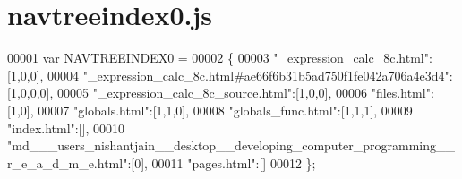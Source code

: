\hypertarget{navtreeindex0_8js_source}{\section{navtreeindex0.\+js}
\label{navtreeindex0_8js_source}
}

\begin{DoxyCode}
\hypertarget{navtreeindex0_8js_source_l00001}{}\hyperlink{navtreeindex0_8js_a27601402e464d8aaacc40c422ad0426a}{00001} var \hyperlink{navtreeindex0_8js_a27601402e464d8aaacc40c422ad0426a}{NAVTREEINDEX0} =
00002 \{
00003 \textcolor{stringliteral}{"\_expression\_calc\_8c.html"}:[1,0,0],
00004 \textcolor{stringliteral}{"\_expression\_calc\_8c.html#ae66f6b31b5ad750f1fe042a706a4e3d4"}:[1,0,0,0],
00005 \textcolor{stringliteral}{"\_expression\_calc\_8c\_source.html"}:[1,0,0],
00006 \textcolor{stringliteral}{"files.html"}:[1,0],
00007 \textcolor{stringliteral}{"globals.html"}:[1,1,0],
00008 \textcolor{stringliteral}{"globals\_func.html"}:[1,1,1],
00009 \textcolor{stringliteral}{"index.html"}:[],
00010 \textcolor{stringliteral}{"md\_\_\_users\_nishantjain\_\_desktop\_\_developing\_computer\_programming\_\_r\_e\_a\_d\_m\_e.html"}:[0],
00011 \textcolor{stringliteral}{"pages.html"}:[]
00012 \};
\end{DoxyCode}
